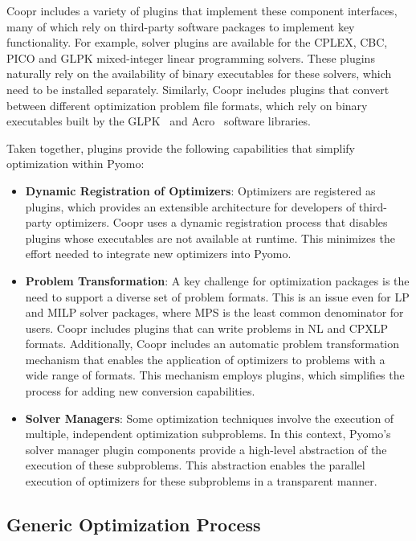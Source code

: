 Coopr includes a variety of plugins that implement these component
interfaces, many of which rely on third-party software packages to
implement key functionality.  For example, solver plugins are available
for the CPLEX, CBC, PICO and GLPK mixed-integer linear programming
solvers.  These plugins naturally rely on the availability of binary
executables for these solvers, which need to be installed separately.
Similarly, Coopr includes plugins that convert between different
optimization problem file formats, which rely on binary executables
built by the GLPK~\citep{GLPK} and Acro~\citep{ACRO} software libraries.

Taken together, plugins provide the following capabilities that simplify optimization within Pyomo:
\begin{itemize}

\item {\bf Dynamic Registration of Optimizers}: Optimizers are registered
as plugins, which provides an extensible architecture for developers
of third-party optimizers.  Coopr uses a dynamic registration process
that disables plugins whose executables are not available at runtime.
This minimizes the effort needed to integrate new optimizers into Pyomo.

\item {\bf Problem Transformation}: A key challenge for optimization
packages is the need to support a diverse set of problem formats.
This is an issue even for LP and MILP solver packages, where MPS is the
least common denominator for users.  Coopr includes plugins that can
write problems in NL and CPXLP formats.  Additionally, Coopr includes an
automatic problem transformation mechanism that enables the application
of optimizers to problems with a wide range of formats.  This mechanism
employs plugins, which simplifies the process for adding new conversion
capabilities.

\item {\bf Solver Managers}: Some optimization techniques involve the
execution of multiple, independent optimization subproblems.  In this
context, Pyomo's solver manager plugin components provide a high-level
abstraction of the execution of these subproblems.  This abstraction
enables the parallel execution of optimizers for these subproblems in
a transparent manner.

\end{itemize}


\subsection{Generic Optimization Process}

